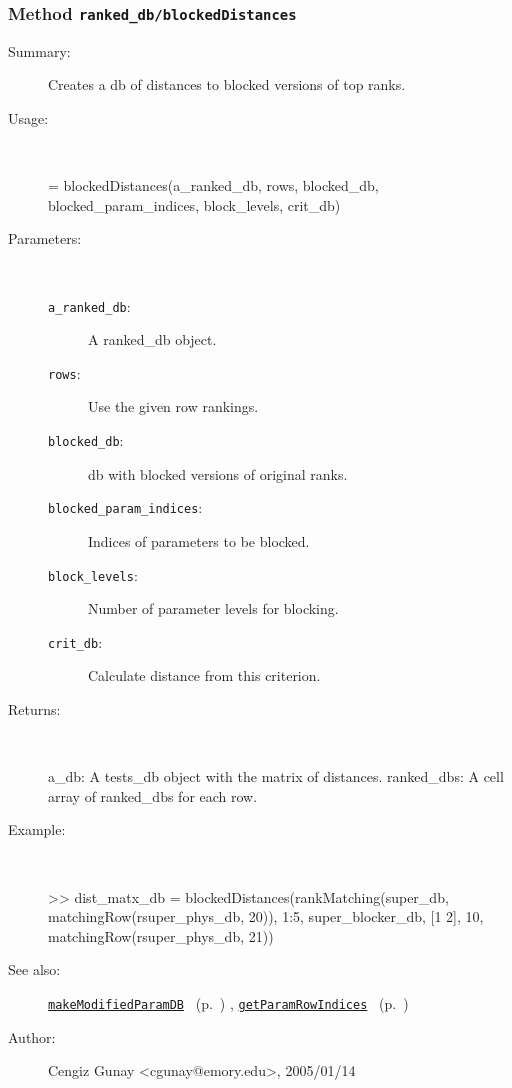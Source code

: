\subsubsection[Method \texttt{blockedDistances}]{Method \texttt{ranked\_db/blockedDistances}}%
%
\label{ref_ranked_db__blockedDistances}%
\hypertarget{ref_ranked_db__blockedDistances}{}%
\begin{description}
\item[Summary:]Creates a db of distances to blocked versions of top ranks.
%
\item[Usage:]~%
\begin{lyxcode}%
[a\_db, ranked\_dbs] = 
   blockedDistances(a\_ranked\_db, rows, blocked\_db, blocked\_param\_indices, 
	  	     block\_levels, crit\_db)
%
\end{lyxcode}%
%
%
\item[Parameters:]~
\begin{description}%
\item[\texttt{a\_ranked\_db}:]
 A ranked\_db object.
\item[\texttt{rows}:]
 Use the given row rankings.
\item[\texttt{blocked\_db}:]
 db with blocked versions of original ranks.
\item[\texttt{blocked\_param\_indices}:]
 Indices of parameters to be blocked.
\item[\texttt{block\_levels}:]
 Number of parameter levels for blocking.
\item[\texttt{crit\_db}:]
 Calculate distance from this criterion.
\end{description}%
%
\item[Returns:]~

	a\_db: A tests\_db object with the matrix of distances.
	ranked\_dbs: A cell array of ranked\_dbs for each row.
%
\item[Example:]~
\begin{lyxcode}        >> dist\_matx\_db = blockedDistances(rankMatching(super\_db, matchingRow(rsuper\_phys\_db, 20)), 1:5, super\_blocker\_db, [1 2], 10, matchingRow(rsuper\_phys\_db, 21))\\%
\end{lyxcode}
%
\item[See also:]%
\hyperlink{ref_makeModifiedParamDB}{\texttt{makeModifiedParamDB}}%
\ (p.~\pageref{ref_makeModifiedParamDB})%
%
, \hyperlink{ref_getParamRowIndices}{\texttt{getParamRowIndices}}%
\ (p.~\pageref{ref_getParamRowIndices})%
%
%
\item[Author:]%
Cengiz Gunay <cgunay@emory.edu>, 2005/01/14%
\end{description}
\methodline%
